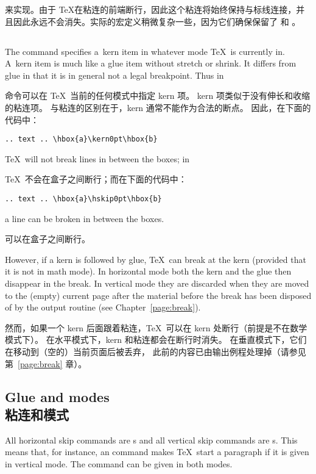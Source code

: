 来实现。由于 \TeX 在粘连的前端断行，因此这个粘连将始终保持与标线连接，并且因此永远不会消失。实际的宏定义稍微复杂一些，因为它们确保保留了  和 。

\subsection{}

The  command specifies
a~kern item in whatever mode \TeX\ is currently
in. A~kern item is much like a glue item without
stretch or shrink.
It differs from glue in that it is
in general not a legal breakpoint. Thus in

 命令可以在 \TeX\ 当前的任何模式中指定 kern 项。
kern 项类似于没有伸长和收缩的粘连项。
与粘连的区别在于，kern 通常不能作为合法的断点。
因此，在下面的代码中：
\begin{verbatim}
.. text .. \hbox{a}\kern0pt\hbox{b}
\end{verbatim}
\TeX\ will not break lines in between the boxes; in

\TeX\ 不会在盒子之间断行；而在下面的代码中：
\begin{verbatim}
.. text .. \hbox{a}\hskip0pt\hbox{b}
\end{verbatim}
a line can be broken in between the boxes.

可以在盒子之间断行。

However, if a kern is followed by glue, \TeX\ can break at the
kern (provided that it is not in math mode). 
In horizontal mode
both the kern and the glue then disappear in the break.
In vertical mode they are discarded when they are moved to
the (empty) current page after the material before
the break has been disposed of by the output routine 
(see Chapter~\ref{page:break}).

然而，如果一个 kern 后面跟着粘连，\TeX\ 可以在 kern 处断行（前提是不在数学模式下）。
在水平模式下，kern 和粘连都会在断行时消失。
在垂直模式下，它们在移动到（空的）当前页面后被丢弃，
此前的内容已由输出例程处理掉（请参见第~\ref{page:break} 章）。

\subsection{Glue and modes\\粘连和模式}

All horizontal skip commands are s and
all vertical skip commands are s.
This means that, for instance, an  command
makes \TeX\ start a paragraph if it is given in vertical mode.
The  command can be given in both modes.

